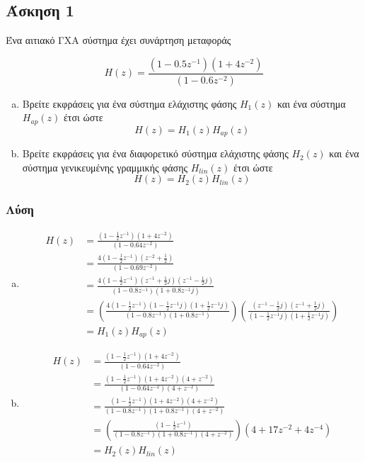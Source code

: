 \newpage\subsection*{Άσκηση 1}

Ένα αιτιακό ΓΧΑ σύστημα έχει συνάρτηση μεταφοράς 

\begin{equation*} H(z) = \frac{(1-0.5z^{-1})(1+4z^{-2})}{(1-0.6z^{-2})} \end{equation*}

\begin{enumerate}[(a)]
\item
Βρείτε εκφράσεις για ένα σύστημα ελάχιστης φάσης $H_1(z)$ και ένα  σύστημα $H_{ap}(z)$ έτσι ώστε
\begin{equation*} H(z) = H_1(z)H_{ap}(z) \end{equation*}

\item
Βρείτε εκφράσεις για ένα διαφορετικό σύστημα ελάχιστης φάσης $H_2(z)$ και ένα  σύστημα γενικευμένης γραμμικής φάσης $H_{lin}(z)$ έτσι ώστε
\begin{equation*} H(z) = H_2(z)H_{lin}(z) \end{equation*}

\end{enumerate}

\subsubsection*{Λύση}

\begin{enumerate}[(a)]

\item
\begin{align*}
    H(z) &= \frac{(1-\frac12z^{-1})(1+4z^{-2})}{(1-0.64z^{-2})} \\
         &= \frac{4(1-\frac12z^{-1})(z^{-2}+\frac12)}{(1-0.69z^{-2})} \\
         &= \frac{4(1-\frac12z^{-1})(z^{-1}+\frac12j)(z^{-1}-\frac12j)}{(1-0.8z^{-1})(1+0.8z^{-1}j)} \\
         &= \left(\frac{4(1-\frac12z^{-1})(1-\frac12z^{-1}j)(1+\frac12z^{-1}j)}{(1-0.8z^{-1})(1+0.8z^{-1})}\right)
            \left(\frac{(z^{-1}-\frac12j)(z^{-1}+\frac12j)}{(1-\frac12z^{-1}j)(1+\frac12z^{-1}j)}\right) \\
         &= H_1(z) H_{ap}(z)
\end{align*}

\item
\begin{align*}
    H(z) &= \frac{(1-\frac12z^{-1})(1+4z^{-2})}{(1-0.64z^{-2})} \\
         &= \frac{(1-\frac12z^{-1})(1+4z^{-2})(4+z^{-2})}{(1-0.64z^{-2})(4+z^{-2})} \\
         &= \frac{(1-\frac12z^{-1})(1+4z^{-2})(4+z^{-2})}{(1-0.8z^{-1})(1+0.8z^{-1})(4+z^{-2})} \\
         &= \left(\frac{(1-\frac12z^{-1})}{(1-0.8z^{-1})(1+0.8z^{-1})(4+z^{-2})}\right) (4 + 17z^{-2} + 4z^{-4}) \\
         &= H_2(z) H_{lin}(z)
\end{align*}

\end{enumerate}

